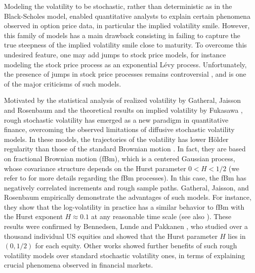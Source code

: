 Modeling the volatility to be stochastic, rather than deterministic as in the Black-Scholes model, enabled quantitative analysts to  explain certain phenomena observed in option price data, in particular the implied volatility smile. However, this family of models has a  main drawback consisting in failing  to capture the true steepness of the implied volatility smile close to maturity. To overcome this undesired feature, one may add jumps to stock price models, for instance modeling the stock price process as an exponential L\'evy process. Unfortunately, the presence of jumps in stock price processes remains controversial \cite{christensen2014fact,bajgrowicz2015jumps}, and is one of the major criticisms of such models. 



Motivated by the statistical analysis of realized volatility by Gatheral, Jaisson and Rosenbaum \cite{gatheral2014volatility} and the theoretical results on implied volatility by Fukasawa \cite{fukasawa2011asymptotic}, rough stochastic volatility has emerged as a new paradigm in quantitative finance, overcoming the observed limitations of  diffusive stochastic volatility models. In these models, the trajectories of the volatility  has lower H\"older regularity than those of the standard Brownian motion \cite{gatheral2014volatility,bayer2016pricing}. In fact, they are based on fractional Brownian motion (fBm), which  is a centered Gaussian process, whose covariance structure depends on the Hurst parameter $0<H<1/2$ (we refer to  \cite{mandelbrot1968fractional,coutin07introduction,biagini2008stochastic} for more details regarding the fBm processes). In this case, the fBm has negatively correlated increments and rough sample paths.   Gatheral, Jaisson, and Rosenbaum \cite{gatheral2014volatility}  empirically demonstrate the advantages of such models. For instance, they show that the log-volatility in practice has a similar behavior to  fBm with the Hurst exponent $H \approx 0.1$ at any reasonable time scale (see also  \cite{gatheral2014volatility_2}).  These results were confirmed  by Bennedsen, Lunde and Pakkanen \cite{bennedsen2016decoupling}, who studied over a thousand individual US equities and showed that the Hurst parameter $H$ lies in $(0,1/2)$ for each equity. Other  works \cite{gatheral2014volatility,bennedsen2016decoupling,bayer2016pricing} showed further benefits of  such rough volatility models over  standard stochastic volatility ones,   in terms of explaining crucial phenomena  observed in  financial markets.
 
